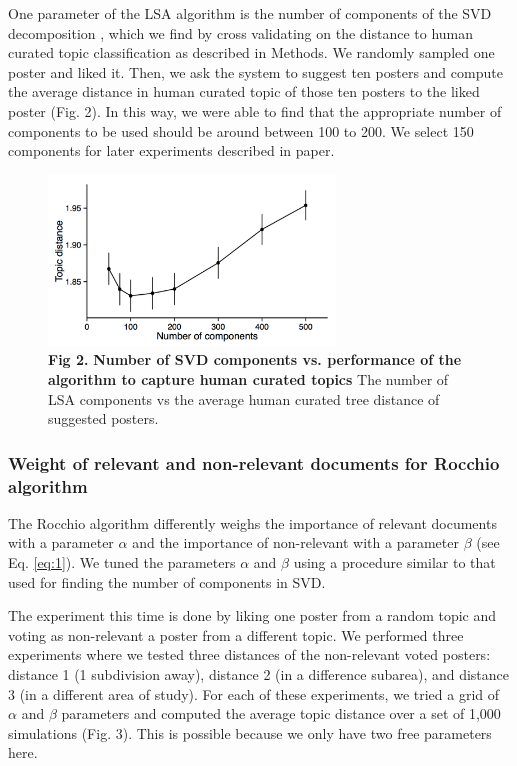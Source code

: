 \documentclass[a4paper]{article}
\begin{document}
One parameter of the LSA algorithm is the number of components of the SVD decomposition \cite{bishop2006pattern}, which we find by cross validating on the distance to human curated topic classification as described in Methods. We randomly sampled one poster and liked it. Then, we ask the system to suggest ten posters and compute the average distance in human curated topic of those ten posters to the liked poster (Fig. 2). In this way, we were able to find that the appropriate number of components to be used should be around between 100 to 200. We select 150 components for later experiments described in paper.


\begin{figure}[!ht]
\centering
\includegraphics[width=3in]{performance_vs_components}
\caption*{\textbf{Fig 2.} \textbf{Number of SVD components vs. performance of the algorithm to capture human curated topics}  The number of LSA components vs the average human curated tree distance of suggested posters.}
\end{figure}



\subsubsection*{Weight of relevant and non-relevant documents for Rocchio algorithm}

The Rocchio algorithm differently weighs the importance of relevant documents with a parameter $\alpha$ and the importance of non-relevant with a parameter $\beta$ (see  Eq. \ref{eq:1}). We tuned the parameters $\alpha$ and $\beta$ using a procedure similar to that used for finding the number of components in SVD.

The experiment this time is done by liking one poster from a random topic and voting as non-relevant a poster from a different topic. We performed three experiments where we tested three distances of the non-relevant voted posters: distance 1 (1 subdivision away), distance 2 (in a difference subarea), and distance 3 (in a different area of study). For each of these experiments, we tried a grid of $\alpha$ and $\beta$ parameters and computed the average topic distance over a set of 1,000 simulations (Fig. 3). This is possible because we only have two free parameters here.
\end{document}
